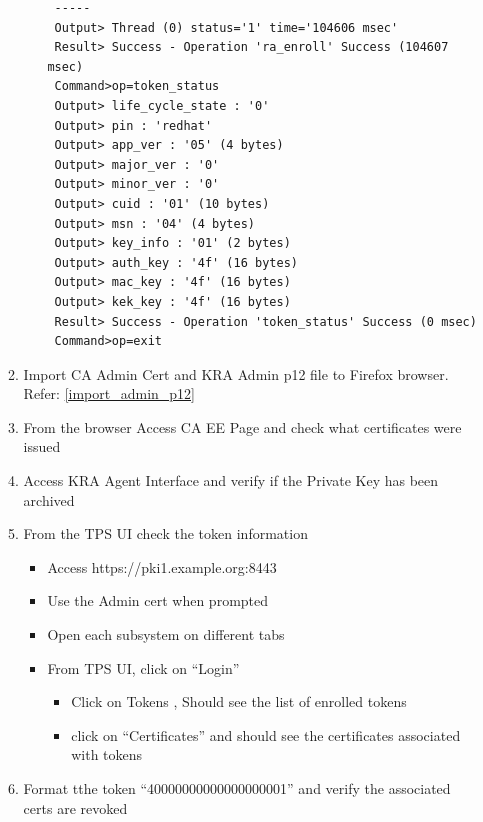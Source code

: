 \documentclass[12pt]{report}
\begin{document}
\begin{enumerate}[label*=\arabic*.]
\begin{enumerate}[label*=\arabic*.]
\begin{itemize}
                        \begin{lstlisting}
 -----
 Output> Thread (0) status='1' time='104606 msec'
 Result> Success - Operation 'ra_enroll' Success (104607 msec)
 Command>op=token_status
 Output> life_cycle_state : '0'
 Output> pin : 'redhat'
 Output> app_ver : '05' (4 bytes)
 Output> major_ver : '0'
 Output> minor_ver : '0'
 Output> cuid : '01' (10 bytes)
 Output> msn : '04' (4 bytes)
 Output> key_info : '01' (2 bytes)
 Output> auth_key : '4f' (16 bytes)
 Output> mac_key : '4f' (16 bytes)
 Output> kek_key : '4f' (16 bytes)
 Result> Success - Operation 'token_status' Success (0 msec)
 Command>op=exit
                        \end{lstlisting}
                \end{itemize}
            \item \label{token_ex5} Import CA Admin Cert and KRA Admin p12 file to Firefox browser. Refer: \ref{import_admin_p12}
            \item \label{token_ex6} From the browser Access CA EE Page and check what certificates were issued
            \item \label{token_ex7} Access KRA Agent Interface and verify if the Private Key has been archived
            \item \label{token_ex8} From the TPS UI check the token information 
                \begin{itemize}
                    \item Access https://pki1.example.org:8443
                    \item Use the Admin cert when prompted
                    \item Open each subsystem on different tabs
                    \item From TPS UI, click on ``Login''
                        \begin{itemize}
                            \item Click on Tokens , Should see the list of enrolled tokens
                            \item click on ``Certificates'' and should see the certificates associated with tokens
                        \end{itemize}
                \end{itemize}
            \item \label{token_ex9}Format tthe token ``40000000000000000001'' and verify the associated certs are revoked
                \begin{itemize}

\end{itemize}
\end{enumerate}
\end{enumerate}
\end{document}
